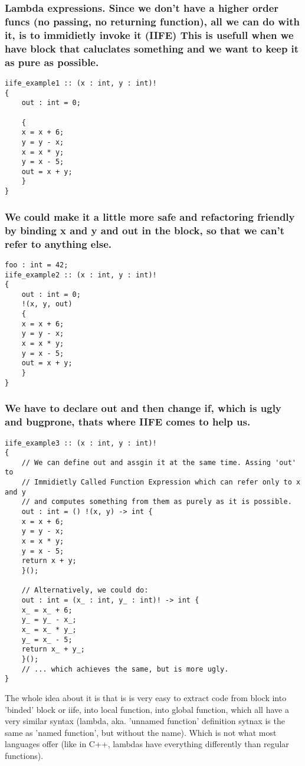 \documentclass[11pt]{article}
\begin{document}
\subsubsection*{Lambda expressions. Since we don't have a higher order funcs (no passing, no returning function), all we can do with it, is to immidietly invoke it (IIFE) This is usefull when we have block that caluclates something and we want to keep it as pure as possible.}
\label{sec:org9564dff}
\begin{verbatim}
iife_example1 :: (x : int, y : int)!
{
    out : int = 0;

    {
	x = x + 6;
	y = y - x;
	x = x * y;
	y = x - 5;
	out = x + y;
    }
}
\end{verbatim}

\subsubsection*{We could make it a little more safe and refactoring friendly by binding x and y and out in the block, so that we can't refer to anything else.}
\label{sec:org3b4d8b2}
\begin{verbatim}
foo : int = 42;
iife_example2 :: (x : int, y : int)!
{
    out : int = 0;
    !(x, y, out)
    {
	x = x + 6;
	y = y - x;
	x = x * y;
	y = x - 5;
	out = x + y;
    }
}
\end{verbatim}

\subsubsection*{We have to declare out and then change if, which is ugly and bugprone, thats where IIFE comes to help us.}
\label{sec:org23c5822}
\begin{verbatim}
iife_example3 :: (x : int, y : int)!
{
    // We can define out and assgin it at the same time. Assing 'out' to
    // Immidietly Called Function Expression which can refer only to x and y
    // and computes something from them as purely as it is possible.
    out : int = () !(x, y) -> int {
	x = x + 6;
	y = y - x;
	x = x * y;
	y = x - 5;
	return x + y;
    }();

    // Alternatively, we could do:
    out : int = (x_ : int, y_ : int)! -> int {
	x_ = x_ + 6;
	y_ = y_ - x_;
	x_ = x_ * y_;
	y_ = x_ - 5;
	return x_ + y_;
    }();
    // ... which achieves the same, but is more ugly.
}
\end{verbatim}

The whole idea about it is that is is very easy to extract code from block into
'binded' block or iife, into local function, into global function, which all
have a very similar syntax (lambda, aka. 'unnamed function' definition sytnax is
the same as 'named function', but without the name). Which is not what most
languages offer (like in C++, lambdas have everything differently than regular
functions).
\end{document}
